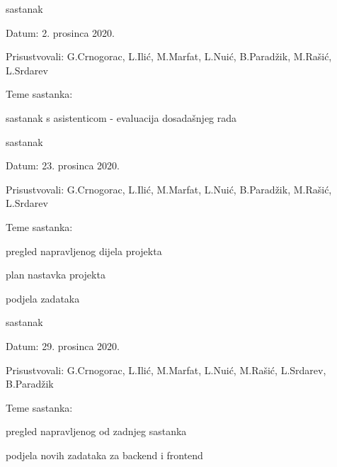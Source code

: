 \begin{packed_enum}
			\item  sastanak
			\item[] \begin{packed_item}
				\item Datum: 2. prosinca 2020.
				\item Prisustvovali:  G.Crnogorac, L.Ilić, M.Marfat, L.Nuić, B.Paradžik, M.Rašić, L.Srdarev 
				\item Teme sastanka:
				\begin{packed_item}
					\item  sastanak s asistenticom - evaluacija dosadašnjeg rada
				\end{packed_item}
			\end{packed_item}
		
			\item  sastanak
			\item[] \begin{packed_item}
				\item Datum: 23. prosinca 2020.
				\item Prisustvovali:  G.Crnogorac, L.Ilić, M.Marfat, L.Nuić, B.Paradžik, M.Rašić, L.Srdarev 
				\item Teme sastanka:
				\begin{packed_item}
					\item  pregled napravljenog dijela projekta
					\item  plan nastavka projekta
					\item  podjela zadataka  
				\end{packed_item}
			\end{packed_item}
		
			\item  sastanak
			\item[] \begin{packed_item}
				\item Datum: 29. prosinca 2020.
				\item Prisustvovali:  G.Crnogorac, L.Ilić, M.Marfat, L.Nuić, M.Rašić, L.Srdarev, B.Paradžik
				\item Teme sastanka:
				\begin{packed_item}
					\item  pregled napravljenog od zadnjeg sastanka 
					\item  podjela novih zadataka za backend i frontend 
				\end{packed_item}
			\end{packed_item}
		

\end{packed_enum}
